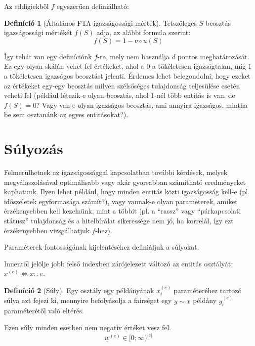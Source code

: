 \documentclass[twocolumn]{article}
\theoremstyle{definition}
\newtheorem{definition}{Definíció}[section]
\newcommand{\vect}[1]{ \underline{#1} }
\newcommand{\ent}[2]{ {#1}^{(#2)} }
\begin{document}
    Az eddigiekből $f$ egyszerűen definiálható:
    
    \begin{definition}[Általános FTA igazságossági mérték]
        Tetszőleges $S$ beosztás igazságossági mértékét $f(S)$ adja, az alábbi formula szerint:
        \begin{equation}
            f(S) = 1 - \nu \circ u(S)
        \end{equation}
    \end{definition}
    
    Így tehát van egy definíciónk $f$-re, mely nem használja $d$ pontos meghatározását. Ez egy olyan skálán vehet fel értékeket, ahol a $0$ a tökéletesen igazságtalan, míg $1$ a tökéletesen igazságos beosztást jelenti. Érdemes lehet belegondolni, hogy ezeket az értékeket egy-egy beosztás milyen szélsőséges tulajdonság teljesülése esetén veheti fel (például létezik-e olyan beosztás, ahol $1$-nél több entitás is van, de $f(S) = 0$? Vagy van-e olyan igazságos beosztás, ami annyira igazságos, mintha be sem osztanánk az egyes entitásokat?).

\section{Súlyozás}
    Felmerülhetnek az igazságossággal kapcsolatban további kérdések, melyek megválaszolásával optimálisabb vagy akár gyorsabban számítható eredményeket kaphatunk. Ilyen lehet például, hogy minden entitás közti igazságosság kell-e (pl. időszeletek egyformasága számít?), vagy vannak-e olyan paraméterek, amiket érzékenyebben kell kezelnünk, mint a többit (pl. a \enquote{rassz} vagy \enquote{párkapcsolati státusz} tulajdonság és a hitelbírálat sikeressége nem jó, ha korrelál, így ezt érzékenyebben vizsgálhatjuk $f$-hez).
    
    Paraméterek fontosságának kijelentéséhez definiáljuk a súlyokat.
    
    Innentől jelölje jobb felső indexben zárójelezett változó az entitás osztályát: $x^{(e)} \Leftrightarrow x::e$.
    
    \begin{definition}[Súly]
        Egy osztály egy példányának $\ent{x}{e}_i$ paraméteréhez tartozó súlya azt fejezi ki, mennyire befolyásolja a fairséget egy $y\sim x$ példány $\ent{y}{e}_i$ paraméterétől való eltérés. 
        
        Ezen súly minden esetben nem negatív értéket vesz fel.
        \begin{equation}
            \ent{\vect w}{e} \in [0;\infty)^{|e|}
        \end{equation}
    \end{definition}
    
\end{document}
